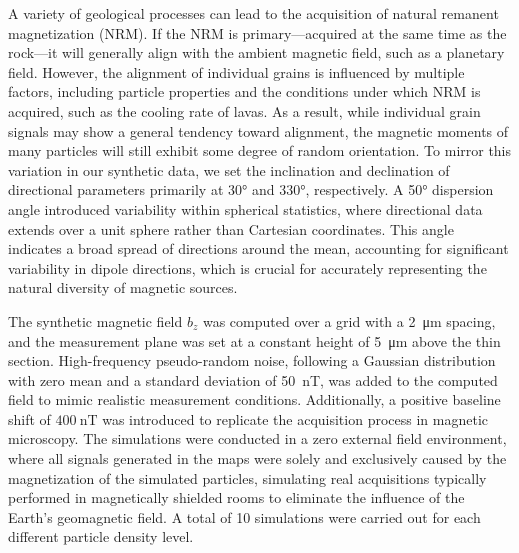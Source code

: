 A variety of geological processes can lead to the acquisition of natural remanent magnetization (NRM). If the NRM is primary—acquired at the same time as the rock—it will generally align with the ambient magnetic field, such as a planetary field. However, the alignment of individual grains is influenced by multiple factors, including particle properties \citep[shape, size, domain state,][]{Bellon2025} and the conditions under which NRM is acquired, such as the cooling rate of lavas. As a result, while individual grain signals may show a general tendency toward alignment, the magnetic moments of many particles will still exhibit some degree of random orientation. To mirror this variation in our synthetic data, we set the inclination and declination of directional parameters primarily at 30° and 330°, respectively. A 50° dispersion angle introduced variability within spherical statistics, where directional data extends over a unit sphere rather than Cartesian coordinates. This angle indicates a broad spread of directions around the mean, accounting for significant variability in dipole directions, which is crucial for accurately representing the natural diversity of magnetic sources.

The synthetic magnetic field \(b_z\) was computed over a grid with a \qty{2}{\um} spacing, and the measurement plane was set at a constant height of \qty{5}{\um} above the thin section. High-frequency pseudo-random noise, following a Gaussian distribution with zero mean and a standard deviation of \qty{50}{\nano\tesla}, was added to the computed field to mimic realistic measurement conditions. Additionally, a positive baseline shift of \(\qty{400}{\nano\tesla}\) was introduced to replicate the acquisition process in magnetic microscopy. The simulations were conducted in a zero external field environment, where all signals generated in the maps were solely and exclusively caused by the magnetization of the simulated particles, simulating real acquisitions typically performed in magnetically shielded rooms to eliminate the influence of the Earth's geomagnetic field. A total of 10 simulations were carried out for each different particle density level.

